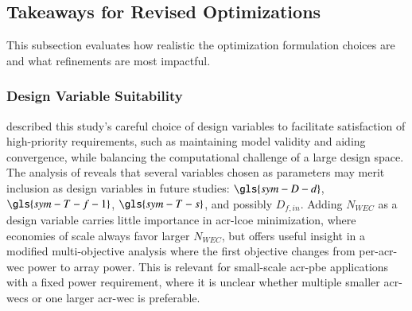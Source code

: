 
\subsection{Takeaways for Revised Optimizations}
This subsection evaluates how realistic the optimization formulation choices are and what refinements are most impactful.

\subsubsection{Design Variable Suitability}
\ifdefined\DISSERTATION
     described this study's careful choice of design variables to facilitate satisfaction of high-priority requirements, such as maintaining model validity and aiding convergence, while balancing the computational challenge of a large design space.
    The analysis of  reveals that several variables chosen as parameters may merit inclusion as design variables in future studies: $\gls{sym-D-d}$, $\gls{sym-T-f-1}$, $\gls{sym-T-s}$, and possibly $D_{f,in}$.
    Adding $N_{WEC}$ as a design variable carries little importance in \gls{acr-lcoe} minimization, where economies of scale always favor larger $N_{WEC}$, but offers useful insight in a modified multi-objective analysis where the first objective changes from per-\gls{acr-wec} power to array power.
    This is relevant for small-scale \gls{acr-pbe} applications with a fixed power requirement, where it is unclear whether multiple smaller \glspl{acr-wec} or one larger \gls{acr-wec} is preferable.
    
